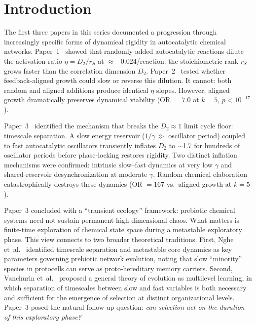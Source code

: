 \documentclass[twocolumn,showpacs,preprintnumbers,amsmath,amssymb,prd,floatfix]{revtex4-2}
\newcommand{\Dtwo}{D_2}
\begin{document}
\maketitle

\section{Introduction}
\label{sec:introduction}

The first three papers in this series documented a progression through increasingly specific forms of dynamical rigidity in autocatalytic chemical networks. Paper~1~\cite{paper1} showed that randomly added autocatalytic reactions dilute the activation ratio $\eta = \Dtwo/r_S$ at $\approx -0.024$/reaction: the stoichiometric rank $r_S$ grows faster than the correlation dimension $\Dtwo$. Paper~2~\cite{paper2} tested whether feedback-aligned growth could slow or reverse this dilution. It cannot: both random and aligned additions produce identical $\eta$ slopes. However, aligned growth dramatically preserves dynamical viability (OR $= 7.0$ at $k = 5$, $p < 10^{-17}$).

Paper~3~\cite{paper3} identified the mechanism that breaks the $\Dtwo \approx 1$ limit cycle floor: timescale separation. A slow energy reservoir ($1/\gamma \gg$ oscillator period) coupled to fast autocatalytic oscillators transiently inflates $\Dtwo$ to $\sim$1.7 for hundreds of oscillator periods before phase-locking restores rigidity. Two distinct inflation mechanisms were confirmed: intrinsic slow--fast dynamics at very low $\gamma$ and shared-reservoir desynchronization at moderate $\gamma$. Random chemical elaboration catastrophically destroys these dynamics (OR $= 167$ vs.\ aligned growth at $k = 5$).

Paper~3 concluded with a ``transient ecology'' framework: prebiotic chemical systems need not sustain permanent high-dimensional chaos. What matters is finite-time exploration of chemical state space during a metastable exploratory phase. This view connects to two broader theoretical traditions. First, Nghe et~al.~\cite{nghe2015} identified timescale separation and metastable core dynamics as key parameters governing prebiotic network evolution, noting that slow ``minority'' species in protocells can serve as proto-hereditary memory carriers. Second, Vanchurin et~al.~\cite{vanchurin2022} proposed a general theory of evolution as multilevel learning, in which separation of timescales between slow and fast variables is both necessary and sufficient for the emergence of selection at distinct organizational levels. Paper~3 posed the natural follow-up question: \textit{can selection act on the duration of this exploratory phase?}
\end{document}
